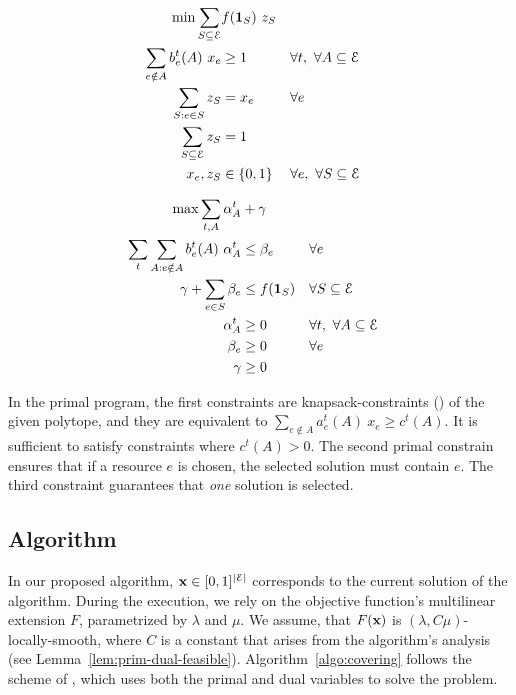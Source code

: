 \begin{minipage}[t]{0.45\textwidth}
\begin{align*}
\min  \sum_{S \subseteq \mathcal{E}} &f(\mathbf{1}_{S})\ z_{S} \\
\sum_{e \notin A} b_{e}^{t}(A) \ x_{e} &\geq 1 & &  \forall t,\ \forall A \subseteq \mathcal{E} \\
\sum_{S: e \in S} z_{S}  &= x_{e}	& & \forall e \\
\sum_{S \subseteq \mathcal{E}} z_{S} &= 1 & & \\
x_{e}, z_{S} &\in \{0,1\} & & \forall e,\ \forall S \subseteq \mathcal{E}\\
\end{align*}
\end{minipage}
\quad
\begin{minipage}[t]{0.5\textwidth}
\begin{align*}
\max \sum_{t, A} \alpha^{t}_{A} &+ \gamma \\
\sum_{t} \sum_{A: e \notin A} b_{e}^{t}(A) \ \alpha_{A}^{t} &\leq \beta_{e}  & &  \forall e \\
\gamma + \sum_{e \in S} \beta_{e} &\leq f(\mathbf{1}_{S})  & & \forall S \subseteq \mathcal{E}\\
\alpha^{t}_{A} &\geq 0 & & \forall t,\ \forall A \subseteq \mathcal{E}\\
\beta_e &\geq 0 & & \forall e\\
\gamma &\geq 0 & &
\end{align*}
\end{minipage}

In the primal program, the first constraints are knapsack-constraints (\cite{CarrFleischer:2000}) of the given polytope, and they are equivalent to $\sum_{e \notin A} a_{e}^{t}(A) \ x_{e} \geq c^{t}(A)$. It is sufficient to satisfy constraints where $c^{t}(A) > 0$. The second primal constrain ensures that if a resource $e$ is chosen, the selected solution must contain $e$.
The third constraint guarantees that \emph{one} solution is selected.

\subsection{Algorithm}
In our proposed algorithm, $\mathbf{x} \in [0, 1]^{|\mathcal{E}|}$ corresponds to the current solution of the algorithm. During the execution, we rely on the objective function's multilinear extension $F$, parametrized by $\lambda$ and $\mu$. We assume, that $F(\mathbf{x})$ is $(\lambda, C \mu)$-locally-smooth, where $C$ is a constant that arises from the algorithm's analysis (see Lemma~\ref{lem:prim-dual-feasible}). Algorithm~\ref{algo:covering} follows the scheme of \cite{Thang20:Online-Primal-Dual}, which uses both the primal and dual variables to solve the problem.

